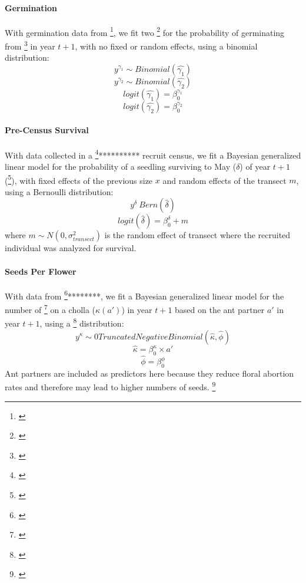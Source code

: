 \documentclass[11pt]{article}
\newcommand{\tom}[2]{{\color{red}{#1}}\footnote{\textit{\color{red}{#2}}}}
\begin{document}
\paragraph{Germination}
With germination data from \tom{Miller et al., 2007}{CITE}, we fit two \tom{Bayesian generalized linear models}{they are all Bayesian glms so no need to say this here.} for the probability of germinating from \tom{a seed in the first year ($\gamma_1$) or the second year ($\gamma_2$)}{This can be described more accurately by referring to the 1 and 2 yo seed banks.} in year $t+1$, with no fixed or random effects, using a binomial distribution:
$$y^{\gamma_1} \sim Binomial(\hat{\gamma_1})$$
$$y^{\gamma_2} \sim Binomial(\hat{\gamma_2})$$
$$logit(\hat{\gamma_1}) = \beta_{0}^{\gamma_1}$$
$$logit(\hat{\gamma_2}) = \beta_{0}^{\gamma_2}$$

\paragraph{Pre-Census Survival}
With data collected in a \tom{2005-2006}{FIX}********** recruit census, we fit a Bayesian generalized linear model for the probability of a seedling surviving to May ($\delta$) of year $t+1$ (\tom{accounting for missed mortality events}{This could be explained more clearly, including the natural history that recruitment occurs months earlier than the census, so we need to account for mortality during that time.}), with fixed effects of the previous size $x$ and random effects of the transect $m$, using a Bernoulli distribution: 
$$y^{\delta} ~ Bern(\hat{\delta})$$
$$logit(\hat{\delta}) = \beta_{0}^{\delta} + m$$
 where $m \sim N(0, \sigma_{transect}^2)$ is the random effect of transect where the recruited individual was analyzed for survival.

\paragraph{Seeds Per Flower}
With data from \tom{Miller 2007}{CITE}********, we fit a Bayesian generalized linear model for the number of \tom{seeds produced by every flower}{This is not seeds per flower, it is seeds per fruit, since the viability model accounts for the probability that a flower becomes a fruit. I would actually move this earlier to follow that order of events.} on a cholla ($\kappa(a')$) in year $t+1$ based on the ant partner $a'$ in year $t+1$, using a \tom{Negative Binomial}{Not sure why this is written as zero-truncated.} distribution:
$$y^{\kappa} \sim 0 Truncated Negative Binomial(\hat{\kappa},\hat{\phi})$$
$$ \hat{\kappa } = \beta_{0}^{\kappa} \times a'$$
$$\hat{\phi} = \beta_{0}^{\phi}$$
Ant partners are included as predictors here because they reduce floral abortion rates and therefore may lead to higher numbers of seeds. 
\tom{}{This paragraph needs to address how we assigned seed number to the ``other'' category.}
\end{document}
